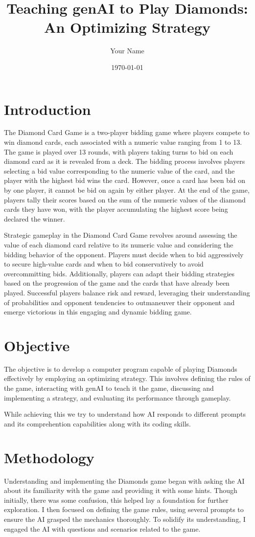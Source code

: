 \documentclass{article}
\title{Teaching genAI to Play Diamonds: An Optimizing Strategy}
\author{Your Name}
\date{\today}
\begin{document}
\maketitle

\section{Introduction}
The Diamond Card Game is a two-player bidding game where players compete to win diamond cards, each associated with a numeric value ranging from 1 to 13. The game is played over 13 rounds, with players taking turns to bid on each diamond card as it is revealed from a deck. The bidding process involves players selecting a bid value corresponding to the numeric value of the card, and the player with the highest bid wins the card. However, once a card has been bid on by one player, it cannot be bid on again by either player. At the end of the game, players tally their scores based on the sum of the numeric values of the diamond cards they have won, with the player accumulating the highest score being declared the winner.

Strategic gameplay in the Diamond Card Game revolves around assessing the value of each diamond card relative to its numeric value and considering the bidding behavior of the opponent. Players must decide when to bid aggressively to secure high-value cards and when to bid conservatively to avoid overcommitting bids. Additionally, players can adapt their bidding strategies based on the progression of the game and the cards that have already been played. Successful players balance risk and reward, leveraging their understanding of probabilities and opponent tendencies to outmaneuver their opponent and emerge victorious in this engaging and dynamic bidding game.
\section{Objective}
The objective is to develop a computer program capable of playing Diamonds effectively by employing an optimizing strategy. This involves defining the rules of the game, interacting with genAI to teach it the game, discussing and implementing a strategy, and evaluating its performance through gameplay.

While achieving this we try to understand how AI responds to different prompts and its comprehention capabilities along with its coding skills.  
\section{Methodology}
Understanding and implementing the Diamonds game began with asking the AI about its familiarity with the game and providing it with some hints. Though initially, there was some confusion, this helped lay a foundation for further exploration. I then focused on defining the game rules, using several prompts to ensure the AI grasped the mechanics thoroughly. To solidify its understanding, I engaged the AI with questions and scenarios related to the game.
\end{document}
